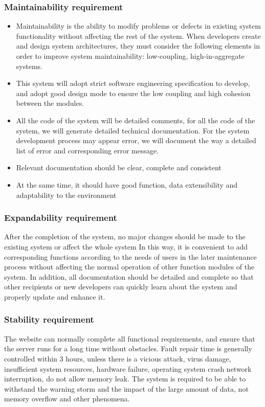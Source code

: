 \documentclass[16pt]{scrreprt}
\begin{document}
\subsubsection{Maintainability requirement}
\begin{itemize}
    \item Maintainability is the ability to modify problems or defects in existing system functionality without affecting the rest of the system.
When developers create and design system architectures, they must consider the following elements in order to improve system maintainability: low-coupling, high-in-aggregate systems.
    \item This system will adopt strict software engineering specification to develop, and adopt good design mode to ensure the low coupling and high cohesion between the modules.
    \item All the code of the system will be detailed comments, for all the code of the system, we will generate detailed technical documentation.
For the system development process may appear error, we will document the way a detailed list of error and corresponding error message.
    \item Relevant documentation should be clear, complete and consistent
    \item At the same time, it should have good function, data extensibility and adaptability to the environment
\end{itemize}

\subsubsection{Expandability requirement}
After the completion of the system, no major changes should be made to the existing system or affect the whole system
In this way, it is convenient to add corresponding functions according to the needs of users in the later maintenance process without affecting the normal operation of other function modules of the system.
In addition, all documentation should be detailed and complete so that other recipients or new developers can quickly learn about the system and properly update and enhance it.

\subsubsection{Stability requirement}
The website can normally complete all functional requirements, and ensure that the server runs for a long time without obstacles.
Fault repair time is generally controlled within 3 hours, unless there is a vicious attack, virus damage, insufficient system resources, hardware failure, operating system crash network interruption, do not allow memory leak.
The system is required to be able to withstand the warning storm and the impact of the large amount of data, not memory overflow and other phenomena.
\end{document}
